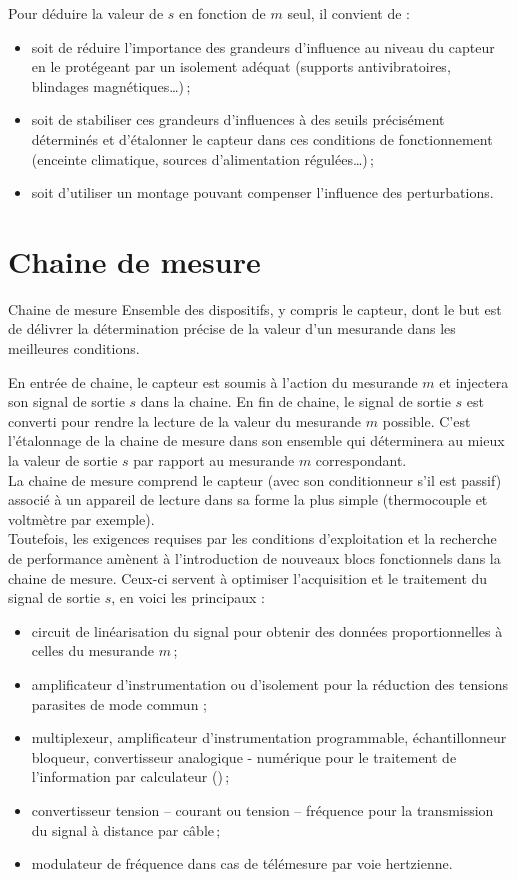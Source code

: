 Pour déduire la valeur de $s$ en fonction de $m$ seul, il convient de :
\begin{itemize}
\item soit de réduire l'importance des grandeurs d'influence au niveau du capteur en le protégeant par un isolement adéquat (supports antivibratoires, blindages magnétiques\ldots)\,;
\item soit de stabiliser ces grandeurs d'influences à des seuils précisément déterminés et d'étalonner le capteur dans ces conditions de fonctionnement (enceinte climatique, sources d'alimentation régulées\ldots)\,;
\item soit d'utiliser un montage pouvant compenser l'influence des perturbations. 
\end{itemize}

\section{Chaine de mesure}

\begin{definition}{Chaine de mesure}{}
Ensemble des dispositifs, y compris le capteur, dont le but est de délivrer la détermination précise de la valeur d'un mesurande dans les meilleures conditions.  
\end{definition}

En entrée de chaine, le capteur est soumis à l'action du mesurande $m$ et injectera son signal de sortie $s$ dans la chaine. En fin de chaine, le signal de sortie $s$ est converti pour rendre la lecture de la valeur du mesurande $m$ possible.
C'est l'étalonnage de la chaine de mesure dans son ensemble qui déterminera au mieux la valeur de sortie $s$ par rapport au mesurande $m$ correspondant. \\
La chaine de mesure comprend le capteur (avec son conditionneur s'il est passif) associé à un appareil de lecture dans sa forme la plus simple (thermocouple et voltmètre par exemple).\\
Toutefois, les exigences requises par les conditions d'exploitation et la recherche de performance amènent à l'introduction de nouveaux blocs fonctionnels dans la chaine de mesure. Ceux-ci servent à optimiser l'acquisition et le traitement du signal de sortie $s$, en voici les principaux :
\begin{itemize}
\item circuit de linéarisation du signal pour obtenir des données proportionnelles à celles du mesurande $m$\,;
\item amplificateur d'instrumentation ou d'isolement pour la réduction des tensions parasites de mode commun ;
\item multiplexeur, amplificateur d'instrumentation programmable, échantillonneur bloqueur, convertisseur analogique - numérique pour le traitement de l'information par calculateur ()\,;
\item convertisseur tension -- courant ou tension -- fréquence pour la transmission du signal à distance par câble\,;
\item modulateur de fréquence dans cas de télémesure par voie hertzienne.
\end{itemize}

